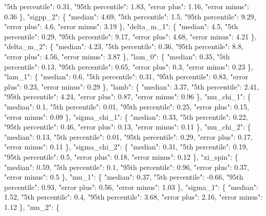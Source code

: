 {{        "5th percentile": 0.31, %
        "95th percentile": 1.83, %
        "error plus": 1.16, %
        "error minus": 0.36%
      \}, %
      "sigpp\_2": \{%
        "median": 4.69, %
        "5th percentile": 1.5, %
        "95th percentile": 9.29, %
        "error plus": 4.6, %
        "error minus": 3.19%
      \}, %
      "delta\_m\_1": \{%
        "median": 4.5, %
        "5th percentile": 0.29, %
        "95th percentile": 9.17, %
        "error plus": 4.68, %
        "error minus": 4.21%
      \}, %
      "delta\_m\_2": \{%
        "median": 4.23, %
        "5th percentile": 0.36, %
        "95th percentile": 8.8, %
        "error plus": 4.56, %
        "error minus": 3.87%
      \}, %
      "lam\_0": \{%
        "median": 0.35, %
        "5th percentile": 0.13, %
        "95th percentile": 0.65, %
        "error plus": 0.3, %
        "error minus": 0.23%
      \}, %
      "lam\_1": \{%
        "median": 0.6, %
        "5th percentile": 0.31, %
        "95th percentile": 0.83, %
        "error plus": 0.23, %
        "error minus": 0.29%
      \}, %
      "lamb": \{%
        "median": 3.37, %
        "5th percentile": 2.41, %
        "95th percentile": 4.24, %
        "error plus": 0.87, %
        "error minus": 0.96%
      \}, %
      "mu\_chi\_1": \{%
        "median": 0.1, %
        "5th percentile": 0.01, %
        "95th percentile": 0.25, %
        "error plus": 0.15, %
        "error minus": 0.09%
      \}, %
      "sigma\_chi\_1": \{%
        "median": 0.33, %
        "5th percentile": 0.22, %
        "95th percentile": 0.46, %
        "error plus": 0.13, %
        "error minus": 0.11%
      \}, %
      "mu\_chi\_2": \{%
        "median": 0.13, %
        "5th percentile": 0.01, %
        "95th percentile": 0.29, %
        "error plus": 0.17, %
        "error minus": 0.11%
      \}, %
      "sigma\_chi\_2": \{%
        "median": 0.31, %
        "5th percentile": 0.19, %
        "95th percentile": 0.5, %
        "error plus": 0.18, %
        "error minus": 0.12%
      \}, %
      "xi\_spin": \{%
        "median": 0.59, %
        "5th percentile": 0.1, %
        "95th percentile": 0.96, %
        "error plus": 0.37, %
        "error minus": 0.5%
      \}, %
      "mu\_1": \{%
        "median": 0.37, %
        "5th percentile": {-}0.66, %
        "95th percentile": 0.93, %
        "error plus": 0.56, %
        "error minus": 1.03%
      \}, %
      "sigma\_1": \{%
        "median": 1.52, %
        "5th percentile": 0.4, %
        "95th percentile": 3.68, %
        "error plus": 2.16, %
        "error minus": 1.12%
      \}, %
      "mu\_2": \{%
}}
